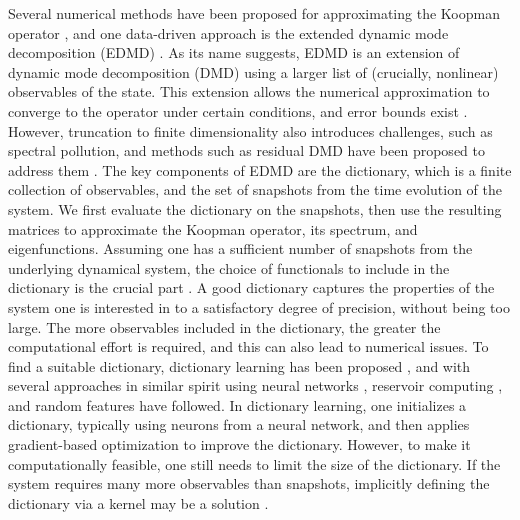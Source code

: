 \documentclass{article}
\begin{document}
Several numerical methods have been proposed for approximating the Koopman operator \citep{rowley-2009, schmid-2010, williams-2015a, giannakis-2015, li-2017, klus-2018, colbrook-2021,schmid-2022}, and one data-driven approach is the extended dynamic mode decomposition (EDMD) \citep{williams-2015a}. As its name suggests, EDMD is an extension of dynamic mode decomposition (DMD) \citep{schmid-2010} using a larger list of (crucially, nonlinear) observables of the state. This extension allows the numerical approximation to converge to the operator under certain conditions, and error bounds exist \citep{mezic-2020, nuske-2023a, llamazares-elias-2024}. However, truncation to finite dimensionality also introduces challenges, such as spectral pollution, and methods such as residual DMD have been proposed to address them \citep{colbrook-2021}. The key components of EDMD are the dictionary, which is a finite collection of observables, and the set of snapshots from the time evolution of the system. We first evaluate the dictionary on the snapshots, then use the resulting matrices to approximate the Koopman operator, its spectrum, and eigenfunctions. Assuming one has a sufficient number of snapshots from the underlying dynamical system, the choice of functionals to include in the dictionary is the crucial part \citep{kutz-2018}. A good dictionary captures the properties of the system one is interested in to a satisfactory degree of precision, without being too large. The more observables included in the dictionary, the greater the computational effort is required, and this can also lead to numerical issues. To find a suitable dictionary, dictionary learning has been proposed \citep{li-2017}, and with several approaches in similar spirit using neural networks \citep{li-2017, otto-2019, constante-amoresricardo-2024, jin-2024, bolager-2024}, reservoir computing \citep{gulina-2021, bollt-2021a}, and random features \citep{salam-2022} have followed. In dictionary learning, one initializes a dictionary, typically using neurons from a neural network, and then applies gradient-based optimization to improve the dictionary. However, to make it computationally feasible, one still needs to limit the size of the dictionary. If the system requires many more observables than snapshots, implicitly defining the dictionary via a kernel may be a solution \citep{williams-2015b}.
\end{document}
